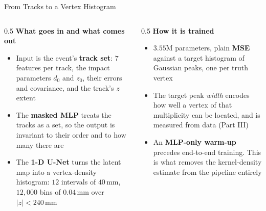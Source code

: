 \documentclass[xcolor=table,aspectratio=169]{beamer}
\begin{document}
\begin{frame}{From Tracks to a Vertex Histogram}
    \vspace{0.7em}
    \begin{columns}[t]
        \begin{column}{0.5\linewidth}
            \footnotesize
            \textbf{What goes in and what comes out}
            \begin{itemize}\setlength\itemsep{0.25em}
                \item Input is the event's \textbf{track set}: $7$ features per track,
                    the impact parameters $d_0$ and $z_0$, their errors and covariance,
                    and the track's $z$ extent
                \item The \textbf{masked MLP} treats the tracks as a set, so the output
                    is invariant to their order and to how many there are
                \item The \textbf{1-D U-Net} turns the latent map into a vertex-density
                    histogram: $12$ intervals of $40$\,mm, $12{,}000$ bins of
                    $0.04$\,mm over $|z| < 240$\,mm
            \end{itemize}
        \end{column}
        \begin{column}{0.5\linewidth}
            \footnotesize
            \textbf{How it is trained}
            \begin{itemize}\setlength\itemsep{0.25em}
                \item $3.55$M parameters, plain \textbf{MSE} against a target histogram
                    of Gaussian peaks, one per truth vertex
                \item The target peak \emph{width} encodes how well a vertex of that
                    multiplicity can be located, and is measured from data (Part III)
                \item An \textbf{MLP-only warm-up} precedes end-to-end training. This is
                    what removes the kernel-density estimate from the pipeline entirely
            \end{itemize}
        \end{column}
    \end{columns}
\end{frame}
\end{document}
